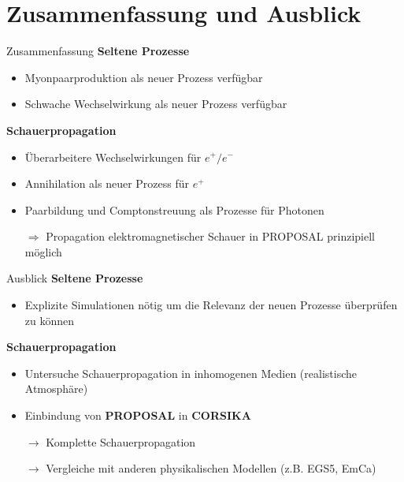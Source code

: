 \documentclass[aspectratio=1610, captions=tableheading, 11pt]{beamer}
\begin{document}

\section{Zusammenfassung und Ausblick}

\begin{frame}{Zusammenfassung}
    \textbf{Seltene Prozesse}
   \begin{itemize}
    \setlength\itemsep{0.5em}
    \item Myonpaarproduktion als neuer Prozess verfügbar 
    \item Schwache Wechselwirkung als neuer Prozess verfügbar
   \end{itemize}

   \textbf{Schauerpropagation}
   \begin{itemize}
    \setlength\itemsep{0.5em}
    \item Überarbeitere Wechselwirkungen für $e^+/e^-$
    \item Annihilation als neuer Prozess für $e^+$
    \item Paarbildung und Comptonstreuung als Prozesse für Photonen
    \item[$\Rightarrow$] Propagation elektromagnetischer Schauer in PROPOSAL prinzipiell möglich
   \end{itemize}
\end{frame}


\begin{frame}{Ausblick}
    \textbf{Seltene Prozesse}
   \begin{itemize}
    \setlength\itemsep{0.5em}
    \item Explizite Simulationen nötig um die Relevanz der neuen Prozesse überprüfen zu können
   \end{itemize}

   \textbf{Schauerpropagation}
   \begin{itemize}
    \setlength\itemsep{0.5em}
    \item Untersuche Schauerpropagation in inhomogenen Medien (realistische Atmosphäre)
    \item Einbindung von \textbf{PROPOSAL} in \textbf{CORSIKA}
    \item[$\rightarrow$] Komplette Schauerpropagation
    \item[$\rightarrow$] Vergleiche mit anderen physikalischen Modellen (z.B. EGS5, EmCa)
   \end{itemize}
\end{frame}
\end{document}
